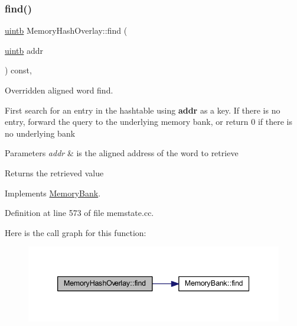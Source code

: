 \subsubsection{\texorpdfstring{find()}{find()}}
{\footnotesize\ttfamily \mbox{\hyperlink{types_8h_a2db313c5d32a12b01d26ac9b3bca178f}{uintb}} Memory\+Hash\+Overlay\+::find (\begin{DoxyParamCaption}\item[{\mbox{\hyperlink{types_8h_a2db313c5d32a12b01d26ac9b3bca178f}{uintb}}}]{addr }\end{DoxyParamCaption}) const\hspace{0.3cm}{\ttfamily [protected]}, {\ttfamily [virtual]}}



Overridden aligned word find. 

First search for an entry in the hashtable using {\bfseries{addr}} as a key. If there is no entry, forward the query to the underlying memory bank, or return 0 if there is no underlying bank 
\begin{DoxyParams}{Parameters}
{\em addr} & is the aligned address of the word to retrieve \\
\hline
\end{DoxyParams}
\begin{DoxyReturn}{Returns}
the retrieved value 
\end{DoxyReturn}


Implements \mbox{\hyperlink{class_memory_bank_a421a5b8dd872d0c3e462d9055fa4266d}{Memory\+Bank}}.



Definition at line 573 of file memstate.\+cc.

Here is the call graph for this function\+:
\nopagebreak
\begin{figure}[H]
\begin{center}
\leavevmode
\includegraphics[width=339pt]{class_memory_hash_overlay_aeef0c9ae78be16ddd22f8a58e1eef419_cgraph}
\end{center}
\end{figure}
\mbox{\label{class_memory_hash_overlay_a7fe029e98139fe7a6fe68b2d4380e3e0}} 
